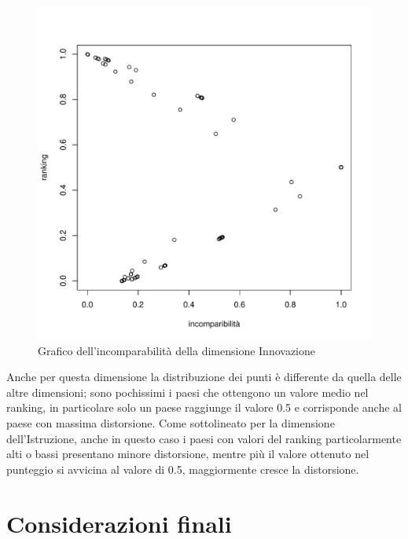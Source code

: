 \documentclass[a4paper,12pt, openright]{report}
\begin{document}
\begin{figure}[H]
    \centering
    \includegraphics[scale=.5]{plot_incom_inn.pdf}
    \caption{Grafico dell'incomparabilità della dimensione Innovazione}
\end{figure}

Anche per questa dimensione la distribuzione dei punti è differente da quella delle altre dimensioni; sono pochissimi i paesi che ottengono 
un valore medio nel ranking, in 
particolare solo un paese raggiunge il valore 0.5 e corrisponde anche al paese con massima distorsione. Come sottolineato per la dimensione
dell'Istruzione, anche in questo
caso i paesi con valori del ranking particolarmente alti o bassi presentano minore distorsione, mentre più il valore ottenuto nel punteggio 
si avvicina al valore di 0.5, 
maggiormente cresce la distorsione. 

\newpage 

\section{Considerazioni finali}
\end{document}
